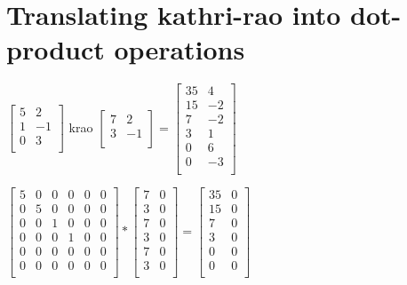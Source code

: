 \documentclass{article}
\begin{document}
\newpage
\section{Translating kathri-rao into dot-product operations}


$
\begin{bmatrix}
5&2\\
1&-1\\
0&3\\
\end{bmatrix}
$
krao 
$
\begin{bmatrix}
7&2\\
3&-1\\
\end{bmatrix}
=
\begin{bmatrix}
35&4\\
15&-2\\
7&-2\\
3&1\\
0&6\\
0&-3\\
\end{bmatrix}
$
\vspace{1cm} 

$
\begin{bmatrix}
5&0&0&0&0&0\\
0&5&0&0&0&0\\
0&0&1&0&0&0\\
0&0&0&1&0&0\\
0&0&0&0&0&0\\
0&0&0&0&0&0\\
\end{bmatrix}
*
\begin{bmatrix}
7&0\\
3&0\\
7&0\\
3&0\\
7&0\\
3&0\\
\end{bmatrix}
=
\begin{bmatrix}
35&0\\
15&0\\
7&0\\
3&0\\
0&0\\
0&0\\
\end{bmatrix}
$
\vspace{1cm} 
\end{document}
